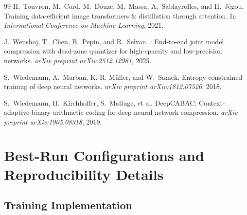\documentclass{article}
\begin{document}
{\begin{thebibliography}{99}
H.~Touvron, M.~Cord, M.~Douze, M.~Massa, A.~Sablayrolles, and H.~J{\'e}gou.
\newblock Training data-efficient image transformers \& distillation through
  attention.
\newblock In \emph{International Conference on Machine Learning}, 2021.

J.~Wensh{\o}j, T.~Chen, B.~Pepin, and R.~Selvan.
: End-to-end joint model compression with dead-zone quantizer
  for high-sparsity and low-precision networks.
\newblock \emph{arXiv preprint arXiv:2512.12981}, 2025.

S.~Wiedemann, A.~Marban, K.-R. M{\"u}ller, and W.~Samek.
\newblock Entropy-constrained training of deep neural networks.
\newblock \emph{arXiv preprint arXiv:1812.07520}, 2018.

S.~Wiedemann, H.~Kirchhoffer, S.~Matlage, et al.
\newblock DeepCABAC: Context-adaptive binary arithmetic coding for deep neural
network compression.
\newblock \emph{arXiv preprint arXiv:1905.08318}, 2019.

\end{thebibliography}
}

\appendix

\section{Best-Run Configurations and Reproducibility Details}
\label{app:experimental-details}

\subsection{Training Implementation}
\label{sec:training-implementation}
\label{app:training-implementation}
\end{document}
